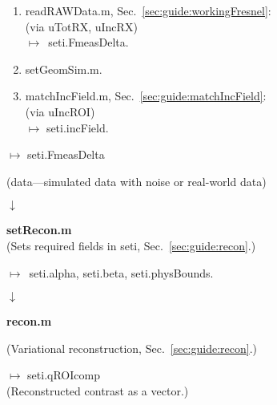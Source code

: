 \begin{minipage}[t]{\dimexpr.56\textwidth-\tabcolsep-.5pt}
\begin{minipage}[t]{\dimexpr.5\textwidth-\tabcolsep-.5pt}
\begin{enumerate}[topsep=0mm, itemsep=0mm, parsep=0mm, leftmargin=3mm, labelsep=0.5mm]
 \item \textsf{readRAWData.m}, Sec.~\ref{sec:guide:workingFresnel}: \\ 
 (via \textsf{uTotRX}, \textsf{uIncRX}) \\ $\mapsto$~\textsf{seti.FmeasDelta}.
 \item \textsf{setGeomSim.m}.
 \item \textsf{matchIncField.m}, Sec.~\ref{sec:guide:matchIncField}:\\ 
 (via \textsf{uIncROI}) \\ $\mapsto$ \textsf{seti.incField}.
\end{enumerate}
\end{minipage}

\bigskip

\centering $\mapsto$ \textsf{seti.FmeasDelta}

\centering (data---simulated data with noise or real-world data)

\centering $\downarrow$
\vspace*{-0.2cm}

\hrulefill

\begin{center}
 
\textbf{\textsf{setRecon.m}}\\

(Sets required fields in \textsf{seti}, Sec.~\ref{sec:guide:recon}.)

$\mapsto$~\textsf{seti.alpha}, \textsf{seti.beta}, \textsf{seti.physBounds}.

\centering $\downarrow$

\textbf{\textsf{recon.m}}

(Variational reconstruction, Sec.~\ref{sec:guide:recon}.)

\addtolength{\fboxsep}{-1pt} %
\addtolength{\fboxsep}{+1pt} %

\medskip

$\mapsto$ \textsf{seti.qROIcomp}\\
(Reconstructed contrast as a vector.)
\end{center}

\end{minipage}
